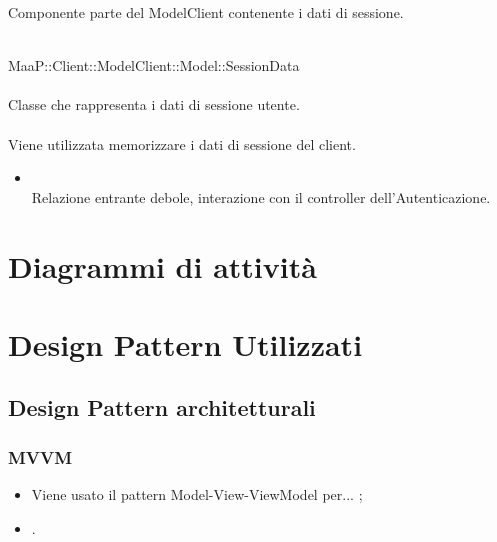 Componente parte del ModelClient contenente i dati di sessione.

	\\
	MaaP::Client::ModelClient::Model::SessionData\\
	\\
	Classe che rappresenta i dati di sessione utente.\\
	\\
	Viene utilizzata memorizzare i dati di sessione del client.\\
	\begin{itemize}
	\item{}\\
	Relazione entrante debole, interazione con il controller dell'Autenticazione.
	\end{itemize}



\newpage
\section{Diagrammi di attività}

\newpage
\section{Design Pattern Utilizzati}%
\subsection{Design Pattern architetturali} %
\subsubsection{MVVM}
\begin{itemize}
\item {} Viene usato il pattern Model-View-ViewModel per... ; 
\item {} .
\end{itemize}

